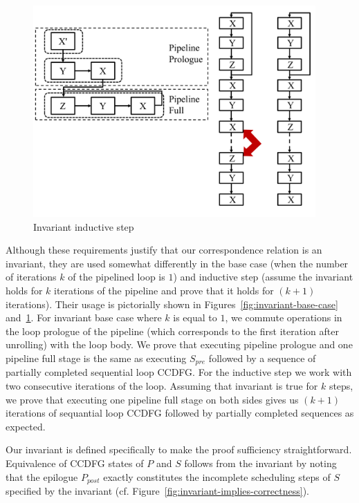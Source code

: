 \begin{figure}[t!]
\begin{center}
\includegraphics[width=4.25in]{fig-proposal/invariant-inductive-step}
\end{center}
\caption{Invariant inductive step}
\label{fig:invariant-inductive-step}
\end{figure}

Although these requirements justify that our correspondence
relation is an invariant, they are used somewhat differently
in the base case (when the number of iterations $k$ of the
pipelined loop is $1$) and inductive step (assume the
invariant holds for $k$ iterations of the pipeline and prove
that it holds for $(k+ 1)$ iterations).  Their usage is
pictorially shown in Figures~\ref{fig:invariant-base-case}
and~\ref{fig:invariant-inductive-step}. For invariant base case where $k$ is
equal to $1$, we commute operations in the loop prologue of
the pipeline (which corresponds to the first iteration after
unrolling) with the loop body. We prove that executing
  pipeline prologue and one pipeline full stage is the same
  as executing $S_{pre}$ followed by a sequence of partially
  completed sequential loop CCDFG. For the inductive step
we work with two consecutive iterations of the loop. Assuming that
  invariant is true for $k$ steps, we prove that executing one pipeline full
  stage on both sides gives us $(k + 1)$ iterations of
  sequantial loop CCDFG followed by partially completed
  sequences as expected.

Our invariant is defined specifically to make the proof
sufficiency straightforward.
Equivalence of CCDFG states of $P$ and $S$ follows from the
invariant by noting that the epilogue $P_{post}$ exactly
constitutes the incomplete scheduling steps of $S$ specified
by the invariant
(cf. Figure~\ref{fig:invariant-implies-correctness}).

